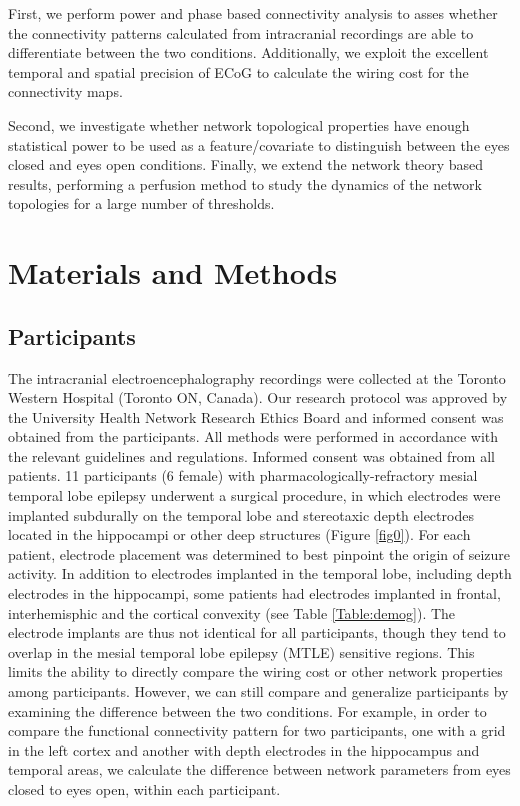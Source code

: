 \documentclass[11pt, onecolumn]{article}
\begin{document}
First, we perform power and phase based connectivity analysis to asses whether the connectivity patterns calculated from intracranial recordings are able to differentiate between the two conditions. Additionally, we exploit the excellent temporal and spatial precision of ECoG to calculate the wiring cost for the connectivity maps. 

Second, we investigate whether network topological properties have enough statistical power to be used as a feature/covariate to distinguish between the eyes closed and eyes open conditions. 
Finally, we extend the network theory based results,   performing a perfusion method to study the dynamics of the network topologies for a large number of thresholds.


\section{Materials and Methods}
\label{se:maandme}
\subsection{Participants}

The intracranial electroencephalography recordings were collected at the Toronto Western Hospital (Toronto ON, Canada). Our research protocol was approved by the University Health Network Research Ethics Board and informed consent was obtained from the participants. All methods were performed in accordance with the relevant guidelines and regulations. Informed consent was obtained from all patients.
11 participants (6 female) with pharmacologically-refractory mesial temporal lobe epilepsy underwent a surgical procedure, in which electrodes were implanted subdurally on the temporal lobe and stereotaxic depth electrodes located in the hippocampi or other deep structures (Figure \ref{fig0}).
For each patient, electrode placement was determined to
best pinpoint the origin of seizure activity. In addition to electrodes implanted in the temporal lobe, including depth electrodes in the hippocampi, some patients had electrodes implanted in frontal, interhemisphic and the cortical convexity (see Table \ref{Table:demog}). The electrode implants are thus not identical for all participants, though they tend to overlap in the mesial temporal lobe epilepsy (MTLE) sensitive regions. This limits the ability to directly compare the wiring cost or other network properties among participants. However, we can still compare and generalize participants by examining the difference between the two conditions. For example, in order to compare the functional connectivity pattern for two participants, one with a grid in the left cortex and another with depth electrodes in the hippocampus and temporal areas, we calculate the difference between network parameters from eyes closed to eyes open, within each participant.
\end{document}
